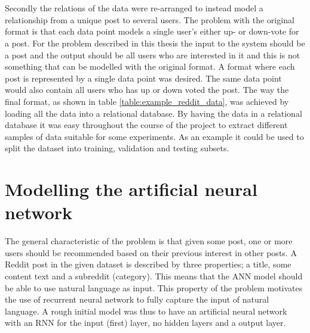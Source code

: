 \\\\
Secondly the relations of the data were re-arranged to instead model a relationship from a unique post to several users. The problem with the original format is that each data point models a single user's either up- or down-vote for a post. For the problem described in this thesis the input to the system should be a post and the output should be all users who are interested in it and this is not something that can be modelled with the original format. A format where each post is represented by a single data point was desired. The same data point would also contain all users who has up or down voted the post. The way the final format, as shown in table \ref{table:example_reddit_data}, was achieved by loading all the data into a relational database. By having the data in a relational database it was easy throughout the course of the project to extract different samples of data suitable for some experiments. As an example it could be used to split the dataset into training, validation and testing subsets.

\section{Modelling the artificial neural network}\label{sec:modelling_the_ann}
The general characteristic of the problem is that given some post, one or more users should be recommended based on their previous interest in other posts. A Reddit post in the given dataset is described by three properties; a title, some content text and a subreddit (category). This means that the ANN model should be able to use natural language as input. This property of the problem motivates the use of recurrent neural network to fully capture the input of natural language. A rough initial model was thus to have an artificial neural network with an RNN for the input (first) layer, no hidden layers and a output layer.


